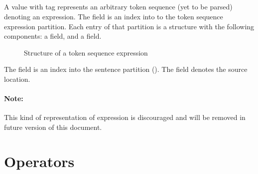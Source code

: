 \subsection{}
\label{sec:ifc:ExprSort:Tokens}

A  value with tag  represents an arbitrary token sequence (yet to be parsed) denoting an expression. 
The  field is an index into to the token sequence expression partition.
Each entry of that partition is a structure with the following components: a  field, and a  field.
%
\begin{figure}[H]
	\centering
	\caption{Structure of a token sequence expression}
	\label{fig:ifc-token-sequence-expression-structure}
\end{figure}
%
The  field is an index into the sentence partition ().
The  field denotes the source location.


\paragraph{Note:} This kind of representation of expression is discouraged and will be removed in future version of this document.



\subsection{}
\label{sec:ifc:ExprSort:AssignInitializer}


\begin{figure}[H]
	\centering
\end{figure}


\section{Operators}
\label{sec:ifc-operators}

